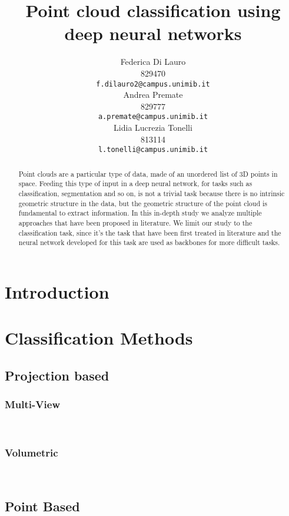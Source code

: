 \documentclass{article}
\title{Point cloud classification using deep neural networks}
\author{
 Federica Di Lauro \\
  829470\\
  \texttt{f.dilauro2@campus.unimib.it} \\
   \And
  Andrea Premate \\
  829777\\
  \texttt{a.premate@campus.unimib.it} \\
  \And
  Lidia Lucrezia Tonelli \\
  813114\\
  \texttt{l.tonelli@campus.unimib.it} \\
}
\begin{document}
\maketitle
\begin{abstract}
Point clouds are a particular type of data, made of an unordered list of 3D points in space. Feeding this type of input in a deep neural network, for tasks such as classification, segmentation and so on, is not a trivial task because there is no intrinsic geometric structure in the data, but the geometric structure of the point cloud is fundamental to extract information. In this in-depth study we analyze multiple approaches that have been proposed in literature. We limit our study to the classification task, since it's the task that have been first treated in literature and the neural network developed for this task are used as backbones for more difficult tasks.
\end{abstract}

\section{Introduction}\label{sec:intro}



\section{Classification Methods}

\subsection{Projection based}


\subsubsection{Multi-View}~\cite{multi_view}~\cite{LBMPFusion}


\subsubsection{Volumetric} ~\cite{VoxNet}


\subsection{Point Based}

\end{document}
